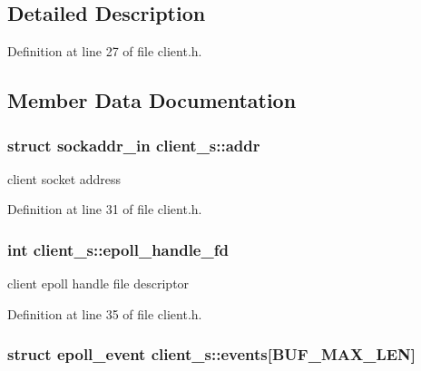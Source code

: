 \subsection{Detailed Description}


Definition at line 27 of file client.\-h.



\subsection{Member Data Documentation}
\hypertarget{structclient__s_a0462afe1661e70a0c69fa24f39387d0f}{
\subsubsection[{addr}]{\setlength{\rightskip}{0pt plus 5cm}struct sockaddr\-\_\-in client\-\_\-s\-::addr}}\label{structclient__s_a0462afe1661e70a0c69fa24f39387d0f}


client socket address 



Definition at line 31 of file client.\-h.

\hypertarget{structclient__s_aadebb75dc03b9055f20d18e6a78865c4}{
\subsubsection[{epoll\-\_\-handle\-\_\-fd}]{\setlength{\rightskip}{0pt plus 5cm}int client\-\_\-s\-::epoll\-\_\-handle\-\_\-fd}}\label{structclient__s_aadebb75dc03b9055f20d18e6a78865c4}


client epoll handle file descriptor 



Definition at line 35 of file client.\-h.

\hypertarget{structclient__s_a06588602dcf6728b79196b73271edf97}{
\subsubsection[{events}]{\setlength{\rightskip}{0pt plus 5cm}struct epoll\-\_\-event client\-\_\-s\-::events\mbox{[}{\bf B\-U\-F\-\_\-\-M\-A\-X\-\_\-\-L\-E\-N}\mbox{]}}}\label{structclient__s_a06588602dcf6728b79196b73271edf97}


